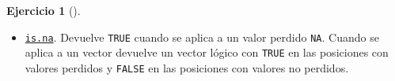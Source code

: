 \documentclass[
  a4paper,
]{scrreport}
\newenvironment{Shaded}{\begin{snugshade}}{\end{snugshade}}
\newcommand{\FunctionTok}[1]{\textcolor[rgb]{0.28,0.35,0.67}{#1}}
\newcommand{\NormalTok}[1]{\textcolor[rgb]{0.00,0.23,0.31}{#1}}
\newcommand{\SpecialCharTok}[1]{\textcolor[rgb]{0.37,0.37,0.37}{#1}}
\providecommand{\tightlist}{%
  \setlength{\itemsep}{0pt}\setlength{\parskip}{0pt}}\usepackage{longtable,booktabs,array}
\theoremstyle{definition}
\newtheorem{exercise}{Ejercicio}[chapter]
\theoremstyle{remark}
\begin{document}
\begin{exercise}[]
\begin{enumerate}
\begin{tcolorbox}
  \begin{itemize}
  \tightlist
  \item
    \href{https://rdrr.io/r/base/NA.html}{\texttt{is.na}}. Devuelve
    \texttt{TRUE} cuando se aplica a un valor perdido \texttt{NA}.
    Cuando se aplica a un vector devuelve un vector lógico con
    \texttt{TRUE} en las posiciones con valores perdidos y
    \texttt{FALSE} en las posiciones con valores no perdidos.
  \end{itemize}

\begin{Shaded}
\end{Shaded}


\end{tcolorbox}
\end{enumerate}
\end{exercise}
\end{document}
